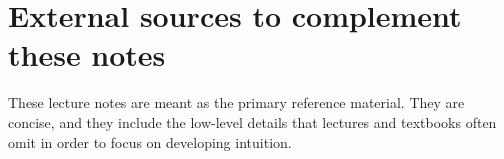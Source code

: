\documentclass[11pt]{article}
\begin{document}
\newcommand{\LNabstract}{%
  These notes are for an undergraduate course on algorithms, covering the usual topics, but with more of an emphasis on learning to do proofs than is found in most courses.
  We take the perspective that being able to verify correctness (via detailed proofs)
  is an integral part of learning to design algorithms.}
\newpage

\section{External sources to complement these notes}\label{prelim: sec: textbooks}

These lecture notes are meant as the primary reference material.
They are concise,
and they include the low-level details that lectures and textbooks often omit
in order to focus on developing intuition.
\end{document}
